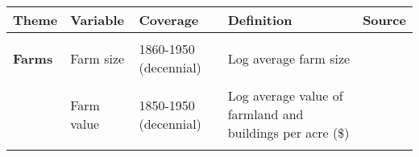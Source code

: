 \begin{tabular}{@{}l|llll@{}}
\hline\hline
\textbf{Theme}                     & \textbf{Variable}                                           & \textbf{Coverage}                     & \textbf{Definition}     & \textbf{Source}                            											     \\
\hline
                                   &                                                             &                                    &             &                                                                                                                                                                                                   \\                                                            
\textbf{Farms} 	      & Farm size          & 1860-1950 (decennial)                       & Log average farm size           & \citet{haines2010}                                                                                                                                                    \\                               
                                     &                                                             &                            &               &            \\     
		&  Farm value                                               &  1850-1950 (decennial)                          & Log average value of farmland and buildings per acre (\$)          & \citet{haines2010}             \\    
                                   &                                                             &                                 &             &                                                                                                                                                                                                   \\                                           

\end{tabular}
